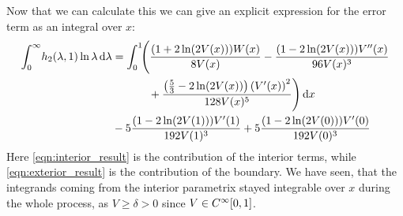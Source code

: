 Now that we can calculate this we can give an explicit expression for the error
term as an integral over $x$:
\begin{align}
  \Integ[\infty]{0}{\lambda}{
    h_2(\lambda, 1) \ln\lambda
  }
  &=
  \label{eqn:interior_result}
  \Int{x}{\Biggl(\frac{(1 + 2 \ln(2 V(x))) W(x)}{8 V(x)}
    - \frac{ (1 - 2 \ln(2 V(x)))V''(x)}{96 V(x)^{3}} \\
    &\hphantom{=\int_0^1\Biggl(}\mathbin{+} \frac{\left(\frac{5}{3} - 2\ln(2
    V(x))\right)\left(V'(x)\right)^{2}}{128 V(x)^{5}}\Biggr) } \nonumber \\
&\mathbin- 5\frac{(1 - 2\ln(2 V(1)))V'(1)}{192 V(1)^3}
+ 5\frac{(1 - 2 \ln(2 V(0)))V'(0)}{192 V(0)^3}
\label{eqn:exterior_result}
\end{align}
Here \eqref{eqn:interior_result} is the contribution of the interior terms,
while \eqref{eqn:exterior_result} is the contribution of the boundary. We have
seen, that the integrands coming from the interior parametrix stayed integrable
over $x$ during the whole process, as $V \geq \delta > 0$ since
$V\in C^\infty_{}{[0,1]}$.
